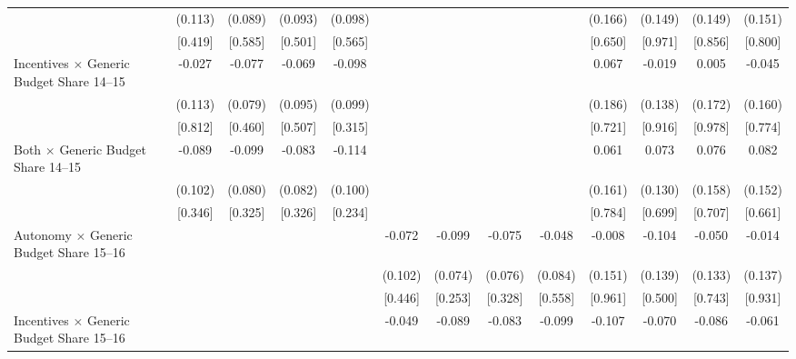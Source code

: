 \begin{tabular}{l*{12}{c}}
                     &     (0.113)&     (0.089)&     (0.093)&     (0.098)&            &            &            &            &     (0.166)&     (0.149)&     (0.149)&     (0.151)\\
                     &     [0.419]&     [0.585]&     [0.501]&     [0.565]&            &            &            &            &     [0.650]&     [0.971]&     [0.856]&     [0.800]\\\addlinespace
Incentives $\times$ Generic Budget Share 14--15&      -0.027&      -0.077&      -0.069&      -0.098&            &            &            &            &       0.067&      -0.019&       0.005&      -0.045\\
                     &     (0.113)&     (0.079)&     (0.095)&     (0.099)&            &            &            &            &     (0.186)&     (0.138)&     (0.172)&     (0.160)\\
                     &     [0.812]&     [0.460]&     [0.507]&     [0.315]&            &            &            &            &     [0.721]&     [0.916]&     [0.978]&     [0.774]\\\addlinespace
Both $\times$ Generic Budget Share 14--15&      -0.089&      -0.099&      -0.083&      -0.114&            &            &            &            &       0.061&       0.073&       0.076&       0.082\\
                     &     (0.102)&     (0.080)&     (0.082)&     (0.100)&            &            &            &            &     (0.161)&     (0.130)&     (0.158)&     (0.152)\\
                     &     [0.346]&     [0.325]&     [0.326]&     [0.234]&            &            &            &            &     [0.784]&     [0.699]&     [0.707]&     [0.661]\\\addlinespace
Autonomy $\times$ Generic Budget Share 15--16&            &            &            &            &      -0.072&      -0.099&      -0.075&      -0.048&      -0.008&      -0.104&      -0.050&      -0.014\\
                     &            &            &            &            &     (0.102)&     (0.074)&     (0.076)&     (0.084)&     (0.151)&     (0.139)&     (0.133)&     (0.137)\\
                     &            &            &            &            &     [0.446]&     [0.253]&     [0.328]&     [0.558]&     [0.961]&     [0.500]&     [0.743]&     [0.931]\\\addlinespace
Incentives $\times$ Generic Budget Share 15--16&            &            &            &            &      -0.049&      -0.089&      -0.083&      -0.099&      -0.107&      -0.070&      -0.086&      -0.061\\

\end{tabular}

